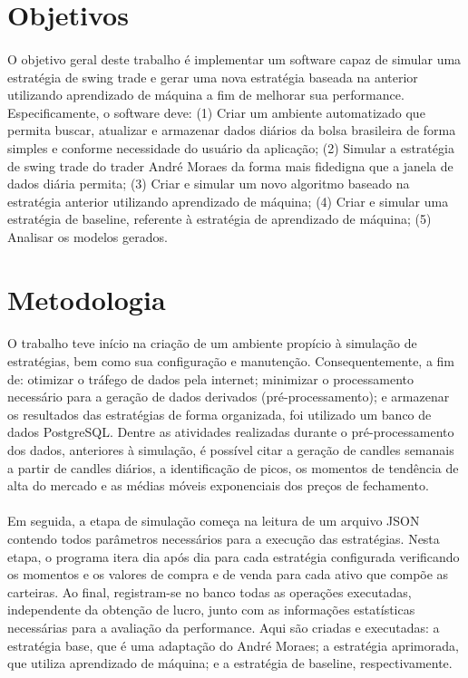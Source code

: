 \section{Objetivos}

\paragraph{} O objetivo geral deste trabalho é implementar um software capaz de simular uma estratégia de swing trade e gerar uma nova estratégia baseada na anterior utilizando aprendizado de máquina a fim de melhorar sua performance. Especificamente, o software deve: (1) Criar um ambiente automatizado que permita buscar, atualizar e armazenar dados diários da bolsa brasileira de forma simples e conforme necessidade do usuário da aplicação; (2) Simular a estratégia de swing trade do trader André Moraes da forma mais fidedigna que a janela de dados diária permita; (3) Criar e simular um novo algoritmo baseado na estratégia anterior utilizando aprendizado de máquina; (4) Criar e simular uma estratégia de baseline, referente à estratégia de aprendizado de máquina; (5) Analisar os modelos gerados.

\section{Metodologia}

\paragraph{} O trabalho teve início na criação de um ambiente propício à simulação de estratégias, bem como sua configuração e manutenção. Consequentemente, a fim de: otimizar o tráfego de dados pela internet; minimizar o processamento necessário para a geração de dados derivados (pré-processamento); e armazenar os resultados das estratégias de forma organizada, foi utilizado um banco de dados PostgreSQL. Dentre as atividades realizadas durante o pré-processamento dos dados, anteriores à simulação, é possível citar a geração de candles semanais a partir de candles diários, a identificação de picos, os momentos de tendência de alta do mercado e as médias móveis exponenciais dos preços de fechamento.

\paragraph{} Em seguida, a etapa de simulação começa na leitura de um arquivo JSON contendo todos parâmetros necessários para a execução das estratégias. Nesta etapa, o programa itera dia após dia para cada estratégia configurada verificando os momentos e os valores de compra e de venda para cada ativo que compõe as carteiras. Ao final, registram-se no banco todas as operações executadas, independente da obtenção de lucro, junto com as informações estatísticas necessárias para a avaliação da performance. Aqui são criadas e executadas: a estratégia base, que é uma adaptação do André Moraes; a estratégia aprimorada, que utiliza aprendizado de máquina; e a estratégia de baseline, respectivamente.

